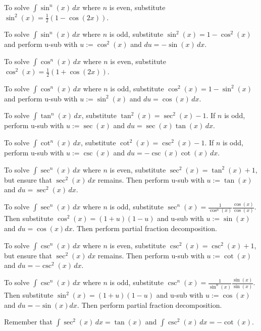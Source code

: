 \begin{procedure} \ \\
  To solve $\int \sin^n(x) \,dx$ where $n$ is even, substitute $\sin^2 (x) = \tfrac{1}{2} (1 - \cos(2x))$.

  To solve $\int \sin^n(x) \,dx$ where $n$ is odd, substitute $\sin^2 (x) = 1 - \cos^2 (x)$ and perform u-sub with $u := \cos^2 (x)$ and $du = -\sin(x) \,dx$.

  To solve $\int \cos^n(x) \,dx$ where $n$ is even, substitute $\cos^2 (x) = \tfrac{1}{2} (1 + \cos(2x))$.

  To solve $\int \cos^n(x) \,dx$ where $n$ is odd, substitute $\cos^2 (x) = 1 - \sin^2 (x)$ and perform u-sub with $u := \sin^2 (x)$ and $du = \cos(x) \,dx$.

  To solve $\int \tan^n(x) \,dx$, substitute $\tan^2 (x) = \sec^2 (x) - 1$. If $n$ is odd, perform u-sub with $u := \sec(x)$ and $du = \sec(x)\tan(x)\,dx$.

  To solve $\int \cot^n(x) \,dx$, substitute $\cot^2 (x) = \csc^2 (x) - 1$. If $n$ is odd, perform u-sub with $u := \csc(x)$ and $du = -\csc(x)\cot(x)\,dx$.

  To solve $\int \sec^n(x) \,dx$ where $n$ is even, substitute $\sec^2(x) = \tan^2(x) + 1$, but ensure that $\sec^2(x)\,dx$ remains. Then perform u-sub with $u := \tan(x)$ and $du = \sec^2(x)\,dx$.

  To solve $\int \sec^n(x) \,dx$ where $n$ is odd, substitute $\sec^n(x) = \frac{1}{\cos^n(x)} \frac{\cos(x)}{\cos(x)}$. Then substitute $\cos^2(x) = (1 + u)(1 - u)$ and u-sub with $u := \sin(x)$ and $du = \cos(x) dx$. Then perform partial fraction decomposition.

  To solve $\int \csc^n(x) \,dx$ where $n$ is even, substitute $\csc^2(x) = \csc^2(x) + 1$, but ensure that $\sec^2(x)\,dx$ remains. Then perform u-sub with $u := \cot(x)$ and $du = -\csc^2(x)\,dx$.

  To solve $\int \csc^n(x) \,dx$ where $n$ is odd, substitute $\csc^n(x) = \frac{1}{\sin^n(x)} \frac{\sin(x)}{\sin(x)}$. Then substitute $\sin^2(x) = (1 + u)(1 - u)$ and u-sub with $u := \cos(x)$ and $du = -\sin(x) dx$. Then perform partial fraction decomposition.

  Remember that $\int \sec^2(x) \,dx = \tan(x)$ and $\int \csc^2(x) \,dx = -\cot(x)$. 
\end{procedure}


